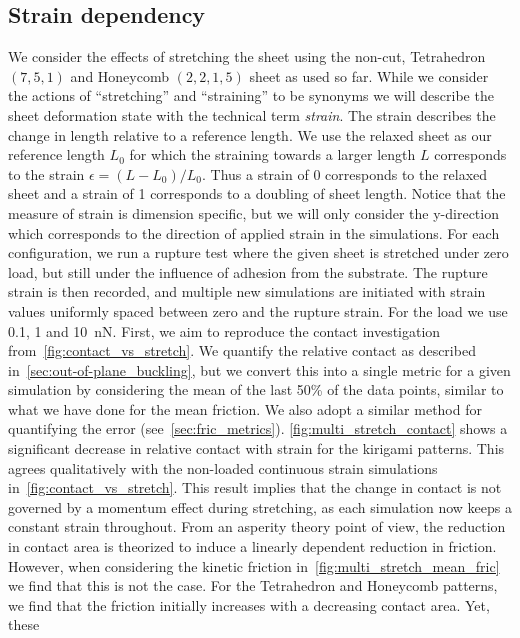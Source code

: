 \subsection{Strain dependency}\label{sec:stretch_dependency}
We consider the effects of stretching the sheet using the non-cut, Tetrahedron
$(7,5,1)$ and Honeycomb $(2,2,1,5)$ sheet as used so far. While we consider the
actions of ``stretching'' and ``straining'' to be synonyms we will describe the
sheet deformation state with the technical term \textit{strain}. The strain
describes the change in length relative to a reference length. We use the
relaxed sheet as our reference length $L_0$ for which the straining towards a
larger length $L$ corresponds to the strain $\epsilon = (L-L_0)/L_0$. Thus a
strain of 0 corresponds to the relaxed sheet and a strain of 1 corresponds to a
doubling of sheet length. Notice that the measure of strain is dimension
specific, but we will only consider the y-direction which corresponds to the
direction of applied strain in the simulations. For each configuration, we run a
rupture test where the given sheet is stretched under zero load, but still under
the influence of adhesion from the substrate. The rupture strain is then
recorded, and multiple new simulations are initiated with strain values
uniformly spaced between zero and the rupture strain. For the load we use 0.1, 1
and \SI{10}{nN}. First, we aim to reproduce the contact investigation
from~\cref{fig:contact_vs_stretch}. We quantify the relative contact as
described in~\cref{sec:out-of-plane_buckling}, but we convert this into a single
metric for a given simulation by considering the mean of the last 50\% of the
data points, similar to what we have done for the mean friction. We also adopt a
similar method for quantifying the error (see~\cref{sec:fric_metrics}).
\cref{fig:multi_stretch_contact} shows a significant decrease in relative
contact with strain for the kirigami patterns. This agrees qualitatively with
the non-loaded continuous strain simulations in~\cref{fig:contact_vs_stretch}.
This result implies that the change in contact is not governed by a momentum
effect during stretching, as each simulation now keeps a constant strain
throughout. From an asperity theory point of view, the reduction in contact area
is theorized to induce a linearly dependent reduction in friction. However, when
considering the kinetic friction in~\cref{fig:multi_stretch_mean_fric} we find
that this is not the case. For the Tetrahedron and Honeycomb patterns, we find
that the friction initially increases with a decreasing contact area. Yet, these
